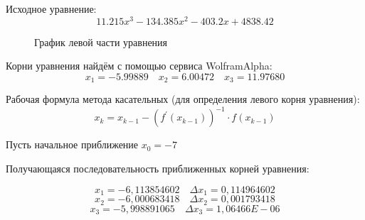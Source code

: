 \documentclass[14pt,a4paper]{scrartcl}
\begin{document}
Исходное уравнение:
\begin{equation*}
	11.215 x^3 - 134.385 x^2 - 403.2 x + 4838.42
\end{equation*}

\begin{figure}[h]
	\caption{График левой части уравнения}
\end{figure}

Корни уравнения найдём с помощью сервиса WolframAlpha:
\begin{equation*}
	x_1 = -5.99889 \quad x_2 = 6.00472 \quad x_3 = 11.97680
\end{equation*}

Рабочая формула метода касательных (для определения левого корня уравнения):
\begin{equation*}
	x_{k}=x_{k-1}-\left(f^{\prime}\left(x_{k-1}\right)\right)^{-1} \cdot f\left(x_{k-1}\right)
\end{equation*}

Пусть начальное приближение $x_0 = -7$

Получающаяся последовательность приближенных корней уравнения:

\begin{equation*}
	x_1 = -6,113854602 \quad \Delta x_1 = 0,114964602
\end{equation*}
\begin{equation*}
	x_2 = -6,000683418 \quad \Delta x_2 = 0,001793418
\end{equation*}
\begin{equation*}
	x_3 = -5,998891065 \quad \Delta x_3 = 1,06466E-06
\end{equation*}
\end{document}
